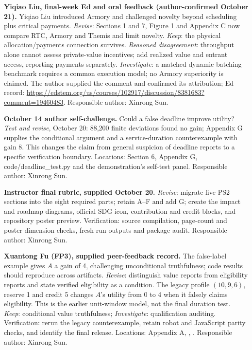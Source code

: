
\textbf{Yiqiao Liu, final-week Ed and oral feedback (author-confirmed October 21).} Yiqiao Liu introduced Armory and challenged novelty beyond scheduling plus critical payments. \emph{Revise}: Sections 1 and 7, Figure 1 and Appendix C now compare RTC, Armory and Themis and limit novelty. \emph{Keep}: the physical allocation/payments connection survives. \emph{Reasoned disagreement}: throughput alone cannot assess private-value incentives; add realized value and entrant access, reporting payments separately. \emph{Investigate}: a matched dynamic-batching benchmark requires a common execution model; no Armory superiority is claimed. The author supplied the comment and confirmed its attribution; Ed record: \url{https://edstem.org/us/courses/102917/discussion/8381683?comment=19460483}. Responsible author: Xinrong Sun.

\textbf{October 14 author self-challenge.} Could a false deadline improve utility? \emph{Test and revise}, October 20: 88,200 finite deviations found no gain; Appendix G supplies the conditional argument and a service-duration counterexample with gain 8. This changes the claim from general suspicion of deadline reports to a specific verification boundary. Locations: Section 6, Appendix G, code/deadline\_test.py and the demonstration's self-test panel. Responsible author: Xinrong Sun.

\textbf{Instructor final rubric, supplied October 20.} \emph{Revise}: migrate five PS2 sections into the eight required parts; retain A--F and add G; create the impact and roadmap diagrams, official SDG icon, contribution and credit blocks, and repository poster preview. Verification: source compilation, page-count and poster-dimension checks, fresh-run outputs and package audit. Responsible author: Xinrong Sun.


\textbf{Xuantong Fu (FP3), supplied peer-feedback record.} The false-label example gives $A$ a gain of 4, challenging unconditional truthfulness; code results should reproduce across artifacts. \emph{Revise}: distinguish value reports from eligibility reports and state verified eligibility as a condition. The legacy profile $(10,9,6)$, reserve 1 and credit 5 changes $A$'s utility from 0 to 4 when it falsely claims eligibility. This is the earlier unit-window model, not the final duration test. \emph{Keep}: conditional value truthfulness; \emph{Investigate}: qualification auditing. Verification: rerun the legacy counterexample, retain robot and JavaScript parity checks, and identify the final release. Locations: Appendix A, , . Responsible author: Xinrong Sun.

